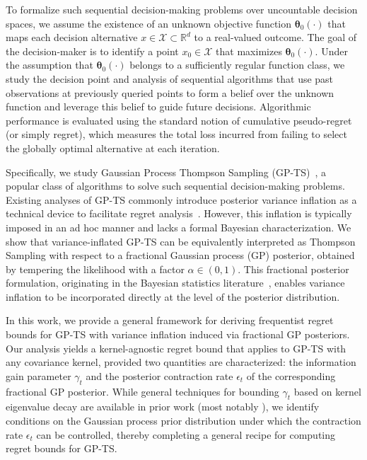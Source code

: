 \documentclass[final,12pt]{colt2026} %
\begin{document}
To formalize such sequential decision-making problems over uncountable decision spaces, we assume the existence of an unknown objective function $\pmb\theta_0(\cdot)$ that maps each decision alternative $x \in \mathcal{X} \subset \mathbb{R}^d$ to a real-valued outcome. The goal of the decision-maker is to identify a point $x_0 \in \mathcal{X}$ that maximizes $\pmb\theta_0(\cdot)$. Under the assumption that $\pmb\theta_0(\cdot)$ belongs to a sufficiently regular function class, we study the decision point and analysis of sequential algorithms that use past observations at previously queried points to form a belief over the unknown function and leverage this belief to guide future decisions. Algorithmic performance is evaluated using the standard notion of cumulative pseudo-regret (or simply regret), which measures the total loss incurred from failing to select the globally optimal alternative at each iteration.

Specifically, we study Gaussian Process Thompson Sampling (GP-TS)~\citep{Ray&Gopalan2017,kandasamy18a}, a popular class of algorithms to solve such sequential decision-making problems. Existing analyses of GP-TS commonly introduce posterior variance inflation as a technical device to facilitate regret analysis~\citep{Ray&Gopalan2017}. However, this inflation is typically imposed in an ad hoc manner and lacks a formal Bayesian characterization. We show that variance-inflated GP-TS can be equivalently interpreted as Thompson Sampling with respect to a fractional Gaussian process (GP) posterior, obtained by tempering the likelihood with a factor $\alpha \in (0,1)$. This fractional posterior formulation, originating in the Bayesian statistics literature~\citep{bhattacharya2019bayesian}, enables variance inflation to be incorporated directly at the level of the posterior distribution. 

In this work, we provide a general framework for deriving frequentist regret bounds for GP-TS with variance inflation induced via fractional GP posteriors. Our analysis yields a kernel-agnostic regret bound that applies to GP-TS with any covariance kernel, provided two quantities are characterized: the information gain parameter $\gamma_t$ and the posterior contraction rate $\epsilon_t$ of the corresponding fractional GP posterior. While general techniques for bounding $\gamma_t$ based on kernel eigenvalue decay are available in prior work (most notably \cite{vakili21a}), we identify conditions on the Gaussian process prior distribution under which the contraction rate $\epsilon_t$ can be controlled, thereby completing a general recipe for computing regret bounds for GP-TS. 
\end{document}
